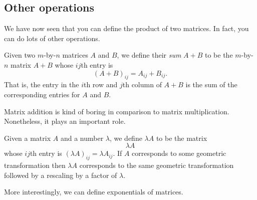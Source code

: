 \documentclass{article}
\begin{document}
\subsection{Other operations}


We have now seen that you can define the product of two matrices. In
fact, you can do lots of other operations.


\begin{Definition}
Given two \(m\)-by-\(n\) matrices \(A\) and \(B\), we define their
{\em sum} \(A+B\) to be the \(m\)-by-\(n\) matrix \(A+B\) whose
\(ij\)th entry is \[(A+B)_{ij}=A_{ij}+B_{ij}.\] That is, the entry
in the \(i\)th row and \(j\)th column of \(A+B\) is the sum of the
corresponding entries for \(A\) and \(B\).


\end{Definition}
\begin{Remark}
Matrix addition is kind of boring in comparison to matrix
multiplication. Nonetheless, it plays an important role.


\end{Remark}
\begin{Definition}[Scaling]\label{dfn:scaling}
Given a matrix \(A\) and a number \(\lambda\), we define \(\lambda
A\) to be the matrix \[\lambda A\] whose \(ij\)th entry is
\((\lambda A)_{ij}=\lambda A_{ij}\). If \(A\) corresponds to some
geometric transformation then \(\lambda A\) corresponds to the same
geometric transformation followed by a rescaling by a factor of
\(\lambda\).


\end{Definition}
More interestingly, we can define exponentials of matrices.
\end{document}
